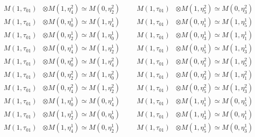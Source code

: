 \begin{align*}
M(1,\tau_{01}) &\otimes M(1,\eta^{2}_{4}) \simeq M(0,\eta^{2}_{2}) &&& M(1,\tau_{01}) &\otimes M(1,\eta^{2}_{5}) \simeq M(0,\eta^{2}_{3})\\
M(1,\tau_{01}) &\otimes M(0,\eta^{1}_{0}) \simeq M(1,\eta^{1}_{4}) &&& M(1,\tau_{01}) &\otimes M(0,\eta^{1}_{1}) \simeq M(1,\eta^{1}_{5})\\
M(1,\tau_{01}) &\otimes M(0,\eta^{1}_{2}) \simeq M(1,\eta^{1}_{0}) &&& M(1,\tau_{01}) &\otimes M(0,\eta^{1}_{3}) \simeq M(1,\eta^{1}_{1})\\
M(1,\tau_{01}) &\otimes M(0,\eta^{1}_{4}) \simeq M(1,\eta^{1}_{2}) &&& M(1,\tau_{01}) &\otimes M(0,\eta^{1}_{5}) \simeq M(1,\eta^{1}_{3})\\
M(1,\tau_{01}) &\otimes M(0,\eta^{2}_{0}) \simeq M(1,\eta^{2}_{4}) &&& M(1,\tau_{01}) &\otimes M(0,\eta^{2}_{1}) \simeq M(1,\eta^{2}_{5})\\
M(1,\tau_{01}) &\otimes M(0,\eta^{2}_{2}) \simeq M(1,\eta^{2}_{0}) &&& M(1,\tau_{01}) &\otimes M(0,\eta^{2}_{3}) \simeq M(1,\eta^{2}_{1})\\
M(1,\tau_{01}) &\otimes M(0,\eta^{2}_{4}) \simeq M(1,\eta^{2}_{2}) &&& M(1,\tau_{01}) &\otimes M(0,\eta^{2}_{5}) \simeq M(1,\eta^{2}_{3})\\
M(1,\tau_{01}) &\otimes M(1,\eta^{1}_{0}) \simeq M(0,\eta^{1}_{4}) &&& M(1,\tau_{01}) &\otimes M(1,\eta^{1}_{1}) \simeq M(0,\eta^{1}_{5})\\
M(1,\tau_{01}) &\otimes M(1,\eta^{1}_{2}) \simeq M(0,\eta^{1}_{0}) &&& M(1,\tau_{01}) &\otimes M(1,\eta^{1}_{3}) \simeq M(0,\eta^{1}_{1})\\
M(1,\tau_{01}) &\otimes M(1,\eta^{1}_{4}) \simeq M(0,\eta^{1}_{2}) &&& M(1,\tau_{01}) &\otimes M(1,\eta^{1}_{5}) \simeq M(0,\eta^{1}_{3})\\
\end{align*}

